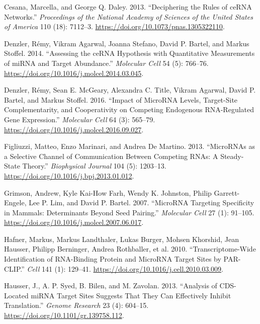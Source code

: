 \documentclass[]{article}
\begin{document}
\leavevmode\hypertarget{ref-cesana_deciphering_2013}{}%
Cesana, Marcella, and George Q. Daley. 2013. ``Deciphering the Rules of
ceRNA Networks.'' \emph{Proceedings of the National Academy of Sciences
of the United States of America} 110 (18): 7112--3.
\url{https://doi.org/10.1073/pnas.1305322110}.

\leavevmode\hypertarget{ref-denzler_assessing_2014}{}%
Denzler, Rémy, Vikram Agarwal, Joanna Stefano, David P. Bartel, and
Markus Stoffel. 2014. ``Assessing the ceRNA Hypothesis with Quantitative
Measurements of miRNA and Target Abundance.'' \emph{Molecular Cell} 54
(5): 766--76. \url{https://doi.org/10.1016/j.molcel.2014.03.045}.

\leavevmode\hypertarget{ref-denzler_impact_2016}{}%
Denzler, Rémy, Sean E. McGeary, Alexandra C. Title, Vikram Agarwal,
David P. Bartel, and Markus Stoffel. 2016. ``Impact of MicroRNA Levels,
Target-Site Complementarity, and Cooperativity on Competing Endogenous
RNA-Regulated Gene Expression.'' \emph{Molecular Cell} 64 (3): 565--79.
\url{https://doi.org/10.1016/j.molcel.2016.09.027}.

\leavevmode\hypertarget{ref-figliuzzi_micrornas_2013}{}%
Figliuzzi, Matteo, Enzo Marinari, and Andrea De Martino. 2013.
``MicroRNAs as a Selective Channel of Communication Between Competing
RNAs: A Steady-State Theory.'' \emph{Biophysical Journal} 104 (5):
1203--13. \url{https://doi.org/10.1016/j.bpj.2013.01.012}.

\leavevmode\hypertarget{ref-grimson_microrna_2007}{}%
Grimson, Andrew, Kyle Kai-How Farh, Wendy K. Johnston, Philip
Garrett-Engele, Lee P. Lim, and David P. Bartel. 2007. ``MicroRNA
Targeting Specificity in Mammals: Determinants Beyond Seed Pairing.''
\emph{Molecular Cell} 27 (1): 91--105.
\url{https://doi.org/10.1016/j.molcel.2007.06.017}.

\leavevmode\hypertarget{ref-hafner_transcriptome-wide_2010}{}%
Hafner, Markus, Markus Landthaler, Lukas Burger, Mohsen Khorshid, Jean
Hausser, Philipp Berninger, Andrea Rothballer, et al. 2010.
``Transcriptome-Wide Identification of RNA-Binding Protein and MicroRNA
Target Sites by PAR-CLIP.'' \emph{Cell} 141 (1): 129--41.
\url{https://doi.org/10.1016/j.cell.2010.03.009}.

\leavevmode\hypertarget{ref-hausser_analysis_2013}{}%
Hausser, J., A. P. Syed, B. Bilen, and M. Zavolan. 2013. ``Analysis of
CDS-Located miRNA Target Sites Suggests That They Can Effectively
Inhibit Translation.'' \emph{Genome Research} 23 (4): 604--15.
\url{https://doi.org/10.1101/gr.139758.112}.
\end{document}
